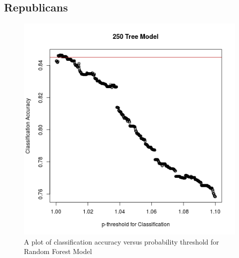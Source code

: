 \documentclass[xcolor=dvipsnames]{beamer}
\begin{document}
\begin{frame}
\subsection{Republicans}
\begin{figure}[h!]
\includegraphics[scale = 0.2]{RFmodelaccuracy250.png}
\caption{A plot of classification accuracy versus probability threshold for Random Forest Model}
\end{figure}
\begin{table}
\centering
{}
\caption{Random Forest with 250 Trees Confusion Matrix.  Has an accuracy of 84.644625\%}
\end{table}
\end{frame}
\end{document}
